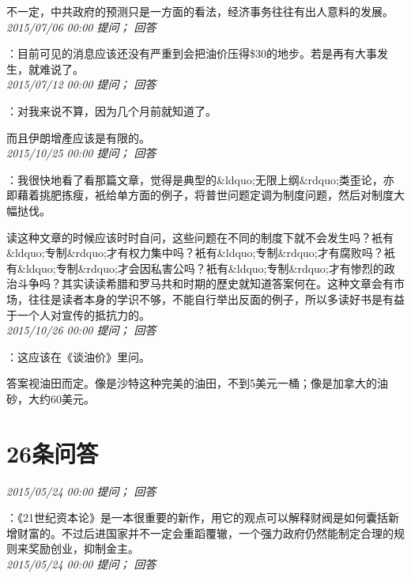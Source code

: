 \documentclass[twocolumn]{ctexart}
\begin{document}
不一定，中共政府的预测只是一方面的看法，经济事务往往有出人意料的发展。\\

\textit{\hfill\noindent\small 2015/07/06 00:00 提问； 回答}

：目前可见的消息应该还没有严重到会把油价压得\$30的地步。若是再有大事发生，就难说了。\\

\textit{\hfill\noindent\small 2015/07/12 00:00 提问； 回答}

：对我来说不算，因为几个月前就知道了。

而且伊朗增產应该是有限的。\\

\textit{\hfill\noindent\small 2015/10/25 00:00 提问； 回答}

：我很快地看了看那篇文章，觉得是典型的\&ldquo;无限上纲\&rdquo;类歪论，亦即藉着挑肥拣瘦，衹给单方面的例子，将普世问题定调为制度问题，然后对制度大幅挞伐。

读这种文章的时候应该时时自问，这些问题在不同的制度下就不会发生吗？衹有\&ldquo;专制\&rdquo;才有权力集中吗？衹有\&ldquo;专制\&rdquo;才有腐败吗？衹有\&ldquo;专制\&rdquo;才会因私害公吗？衹有\&ldquo;专制\&rdquo;才有惨烈的政治斗争吗？其实读读希腊和罗马共和时期的歷史就知道答案何在。这种文章会有市场，往往是读者本身的学识不够，不能自行举出反面的例子，所以多读好书是有益于一个人对宣传的抵抗力的。\\

\textit{\hfill\noindent\small 2015/10/26 00:00 提问； 回答}

：这应该在《谈油价》里问。

答案视油田而定。像是沙特这种完美的油田，不到5美元一桶；像是加拿大的油砂，大约60美元。\\

\section{26条问答}

\textit{\hfill\noindent\small 2015/05/24 00:00 提问； 回答}

：《21世纪资本论》是一本很重要的新作，用它的观点可以解释财阀是如何囊括新增财富的。不过后进国家并不一定会重蹈覆辙，一个强力政府仍然能制定合理的规则来奖励创业，抑制金主。\\

\textit{\hfill\noindent\small 2015/05/24 00:00 提问； 回答}
\end{document}

